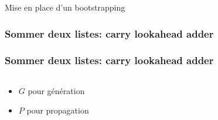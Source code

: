 \documentclass[10pt,xcolor={usenames,dvipsnames}]{beamer}
\begin{document}
\begin{section}{Mise en place d'un bootstrapping}

\begin{frame} 
\frametitle{Sommer deux listes: carry lookahead adder}
  \begin{figure}
    \begin{center}
      \begin{tikzpicture}[scale = 1, transform shape]
      	
      \end{tikzpicture}
    \end{center}
  \end{figure}
\end{frame} 


\begin{frame} 
\frametitle{Sommer deux listes: carry lookahead adder}
  \begin{figure}
    \begin{center}
      \begin{tikzpicture}[scale = 0.5, transform shape]
      	
      \end{tikzpicture}
    \end{center}
  \end{figure}

\begin{columns}
\begin{column}{0.4\textwidth}
\begin{itemize}
\item $G$ pour génération
  \begin{figure}
    \begin{center}
      \begin{tikzpicture}[scale = 0.6, transform shape]
      	
      \end{tikzpicture}
    \end{center}
  \end{figure}
\item $P$ pour propagation
  \begin{figure}
    \begin{center}
      \begin{tikzpicture}[scale = 0.6, transform shape]
      	
      \end{tikzpicture}
    \end{center}
  \end{figure}
\end{itemize}
\end{column}


\end{columns}
\end{frame}
\end{section}
\end{document}
